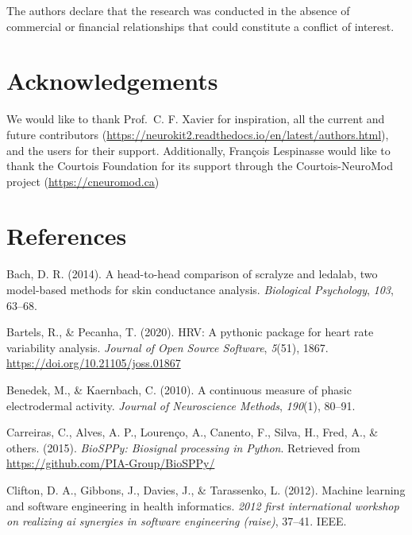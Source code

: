 \documentclass[
  english,
  man,floatsintext]{apa6}
\begin{document}
The authors declare that the research was conducted in the absence of commercial or financial relationships that could constitute a conflict of interest.

\hypertarget{acknowledgements}{%
\section{Acknowledgements}\label{acknowledgements}}

We would like to thank Prof.~C. F. Xavier for inspiration, all the current and future contributors (\url{https://neurokit2.readthedocs.io/en/latest/authors.html}), and the users for their support. Additionally, François Lespinasse would like to thank the Courtois Foundation for its support through the Courtois-NeuroMod project (\url{https://cneuromod.ca})

\newpage

\hypertarget{references}{%
\section{References}\label{references}}

\begingroup
\setlength{\parindent}{-0.5in}
\setlength{\leftskip}{0.5in}

\hypertarget{refs}{}
\leavevmode\hypertarget{ref-bach2014head}{}%
Bach, D. R. (2014). A head-to-head comparison of scralyze and ledalab, two model-based methods for skin conductance analysis. \emph{Biological Psychology}, \emph{103}, 63--68.

\leavevmode\hypertarget{ref-HRV}{}%
Bartels, R., \& Pecanha, T. (2020). HRV: A pythonic package for heart rate variability analysis. \emph{Journal of Open Source Software}, \emph{5}(51), 1867. \url{https://doi.org/10.21105/joss.01867}

\leavevmode\hypertarget{ref-benedek2010continuous}{}%
Benedek, M., \& Kaernbach, C. (2010). A continuous measure of phasic electrodermal activity. \emph{Journal of Neuroscience Methods}, \emph{190}(1), 80--91.

\leavevmode\hypertarget{ref-biosppy}{}%
Carreiras, C., Alves, A. P., Lourenço, A., Canento, F., Silva, H., Fred, A., \& others. (2015). \emph{BioSPPy: Biosignal processing in Python}. Retrieved from \url{https://github.com/PIA-Group/BioSPPy/}

\leavevmode\hypertarget{ref-clifton2012machine}{}%
Clifton, D. A., Gibbons, J., Davies, J., \& Tarassenko, L. (2012). Machine learning and software engineering in health informatics. \emph{2012 first international workshop on realizing ai synergies in software engineering (raise)}, 37--41. IEEE.
\end{document}
